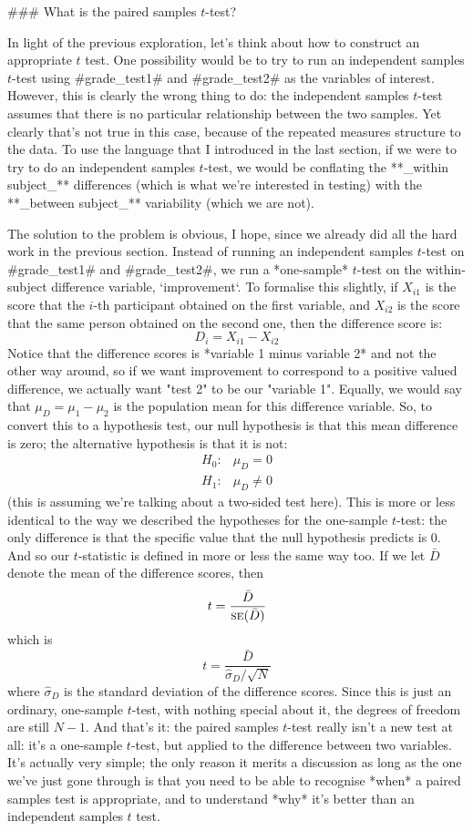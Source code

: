 ### What is the paired samples $t$-test?

In light of the previous exploration, let's think about how to construct an appropriate $t$ test. One possibility would be to try to run an independent samples $t$-test using \rtextverb#grade_test1# and \rtextverb#grade_test2# as the variables of interest. However, this is clearly the wrong thing to do: the independent samples $t$-test assumes that there is no particular relationship between the two samples. Yet clearly that's not true in this case, because of the repeated measures structure to the data. To use the language that I introduced in the last section, if we were to try to do an independent samples $t$-test, we would be conflating the **_within subject_** differences (which is what we're interested in testing) with the **_between subject_** variability (which we are not). 

The solution to the problem is obvious, I hope, since we already did all the hard work in the previous section. Instead of running an independent samples $t$-test on \rtextverb#grade_test1# and \rtextverb#grade_test2#, we run a *one-sample* $t$-test on the within-subject difference variable, `improvement`. To formalise this slightly, if $X_{i1}$ is the score that the $i$-th participant obtained on the first variable, and $X_{i2}$ is the score that the same person obtained on the second one, then the difference score is:
$$
D_{i} = X_{i1} - X_{i2} 
$$
Notice that the difference scores is *variable 1 minus variable 2* and not the other way around, so if we want improvement to correspond to a positive valued difference, we actually want "test 2" to be our "variable 1". Equally, we would say that $\mu_D = \mu_1 - \mu_2$ is the population mean for this difference variable. So, to convert this to a hypothesis test, our null hypothesis is that this mean difference is zero; the alternative hypothesis is that it is not:
$$
\begin{array}{ll}
H_0: & \mu_D = 0  \\
H_1: & \mu_D \neq 0
\end{array}
$$
(this is assuming we're talking about a two-sided test here). This is more or less identical to the way we described the hypotheses for the one-sample $t$-test: the only difference is that the specific value that the null hypothesis predicts is 0. And so our $t$-statistic is defined in more or less the same way too. If we let $\bar{D}$ denote the mean of the difference scores, then 
$$
t = \frac{\bar{D}}{\mbox{\textsc{se}}(\bar{D})}
$$
which is 
$$
t = \frac{\bar{D}}{\hat\sigma_D / \sqrt{N}}
$$
where $\hat\sigma_D$ is the standard deviation of the difference scores. Since this is just an ordinary, one-sample $t$-test, with nothing special about it, the degrees of freedom are still $N-1$. And that's it: the paired samples $t$-test really isn't a new test at all: it's a one-sample $t$-test, but applied to the difference between two variables. It's actually very simple; the only reason it merits a discussion as long as the one we've just gone through is that you need to be able to recognise *when* a paired samples test is appropriate, and to understand *why* it's better than an independent samples $t$ test. 

